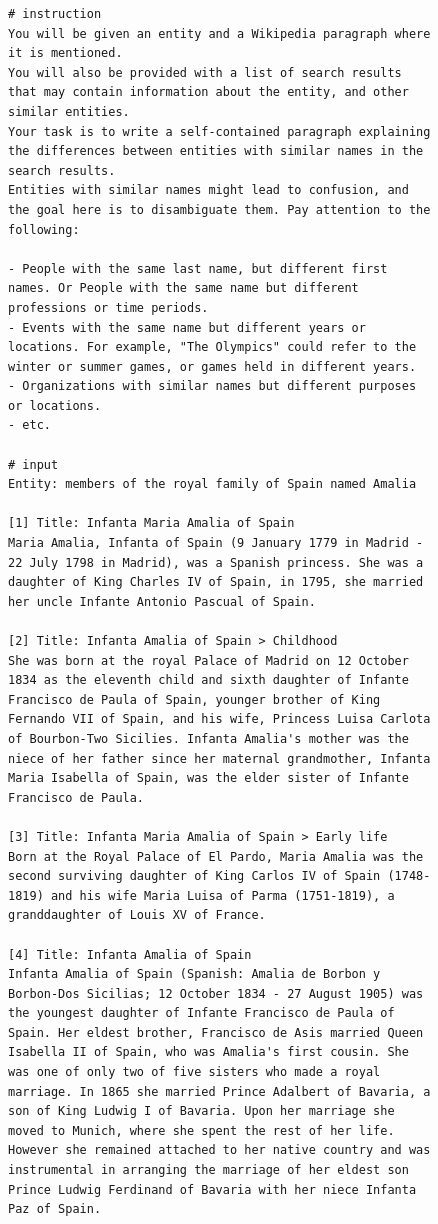\documentclass[11pt]{article}
\begin{document}
\begin{figure}[htb]
\begin{lstlisting}
# instruction
You will be given an entity and a Wikipedia paragraph where it is mentioned.
You will also be provided with a list of search results that may contain information about the entity, and other similar entities.
Your task is to write a self-contained paragraph explaining the differences between entities with similar names in the search results.
Entities with similar names might lead to confusion, and the goal here is to disambiguate them. Pay attention to the following:

- People with the same last name, but different first names. Or People with the same name but different professions or time periods.
- Events with the same name but different years or locations. For example, "The Olympics" could refer to the winter or summer games, or games held in different years.
- Organizations with similar names but different purposes or locations.
- etc.

# input
Entity: members of the royal family of Spain named Amalia

[1] Title: Infanta Maria Amalia of Spain
Maria Amalia, Infanta of Spain (9 January 1779 in Madrid - 22 July 1798 in Madrid), was a Spanish princess. She was a daughter of King Charles IV of Spain, in 1795, she married her uncle Infante Antonio Pascual of Spain.

[2] Title: Infanta Amalia of Spain > Childhood
She was born at the royal Palace of Madrid on 12 October 1834 as the eleventh child and sixth daughter of Infante Francisco de Paula of Spain, younger brother of King Fernando VII of Spain, and his wife, Princess Luisa Carlota of Bourbon-Two Sicilies. Infanta Amalia's mother was the niece of her father since her maternal grandmother, Infanta Maria Isabella of Spain, was the elder sister of Infante Francisco de Paula.

[3] Title: Infanta Maria Amalia of Spain > Early life
Born at the Royal Palace of El Pardo, Maria Amalia was the second surviving daughter of King Carlos IV of Spain (1748-1819) and his wife Maria Luisa of Parma (1751-1819), a granddaughter of Louis XV of France.

[4] Title: Infanta Amalia of Spain
Infanta Amalia of Spain (Spanish: Amalia de Borbon y Borbon-Dos Sicilias; 12 October 1834 - 27 August 1905) was the youngest daughter of Infante Francisco de Paula of Spain. Her eldest brother, Francisco de Asis married Queen Isabella II of Spain, who was Amalia's first cousin. She was one of only two of five sisters who made a royal marriage. In 1865 she married Prince Adalbert of Bavaria, a son of King Ludwig I of Bavaria. Upon her marriage she moved to Munich, where she spent the rest of her life. However she remained attached to her native country and was instrumental in arranging the marriage of her eldest son Prince Ludwig Ferdinand of Bavaria with her niece Infanta Paz of Spain.


\end{lstlisting}
\end{figure}
\end{document}
